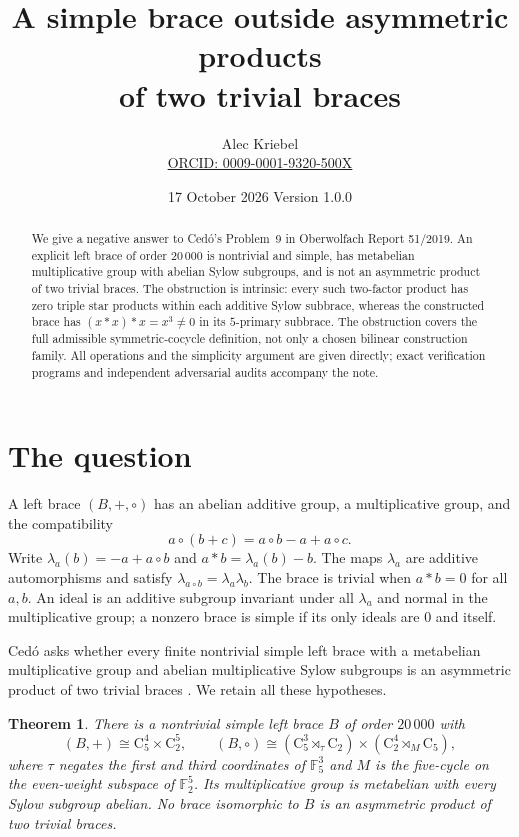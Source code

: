 \documentclass[11pt]{article}
\title{A simple brace outside asymmetric products\\of two trivial braces}
\author{Alec Kriebel\\
\small\href{https://orcid.org/0009-0001-9320-500X}{ORCID: 0009-0001-9320-500X}}
\date{17 October 2026 \quad Version 1.0.0}
\newtheorem{theorem}{Theorem}
\newcommand{\F}{\mathbb F}
\newcommand{\C}{\mathrm C}
\begin{document}
\maketitle
\begin{abstract}
We give a negative answer to Ced\'o's Problem~9 in Oberwolfach Report
51/2019. An explicit left brace of order $20\,000$ is nontrivial and
simple, has metabelian multiplicative group with abelian Sylow
subgroups, and is not an asymmetric product of two trivial braces.
The obstruction is intrinsic: every such two-factor product has zero
triple star products within each additive Sylow subbrace, whereas the
constructed brace has $(x*x)*x=x^3\ne0$ in its $5$-primary subbrace.
The obstruction covers the full admissible symmetric-cocycle definition,
not only a chosen bilinear construction family. All operations and the
simplicity argument are given directly; exact verification programs and
independent adversarial audits accompany the note.
\end{abstract}

\section{The question}
A left brace $(B,+,\circ)$ has an abelian additive group, a multiplicative
group, and the compatibility
\[
 a\circ(b+c)=a\circ b-a+a\circ c.
\]
Write $\lambda_a(b)=-a+a\circ b$ and $a*b=\lambda_a(b)-b$.
The maps $\lambda_a$ are additive automorphisms and satisfy
$\lambda_{a\circ b}=\lambda_a\lambda_b$.
The brace is trivial when $a*b=0$ for all $a,b$.
An ideal is an additive subgroup invariant under all $\lambda_a$ and
normal in the multiplicative group; a nonzero brace is simple if its
only ideals are $0$ and itself.

Ced\'o asks whether every finite nontrivial simple left brace with a
metabelian multiplicative group and abelian multiplicative Sylow
subgroups is an asymmetric product of two trivial braces
\cite[p.~3228, Problem~9]{OWR}. We retain all these hypotheses.

\begin{theorem}\label{thm:main}
There is a nontrivial simple left brace $B$ of order $20\,000$ with
\[
 (B,+)\cong\C_5^4\times\C_2^5,\qquad
 (B,\circ)\cong(\C_5^3\rtimes_\tau\C_2)
                 \times(\C_2^4\rtimes_M\C_5),
\]
where $\tau$ negates the first and third coordinates of $\F_5^3$ and
$M$ is the five-cycle on the even-weight subspace of $\F_2^5$.
Its multiplicative group is metabelian with every Sylow subgroup
abelian. No brace isomorphic to $B$ is an asymmetric product of two
trivial braces.
\end{theorem}
\end{document}
